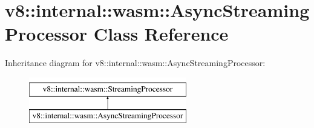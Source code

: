 \hypertarget{classv8_1_1internal_1_1wasm_1_1AsyncStreamingProcessor}{}\section{v8\+:\+:internal\+:\+:wasm\+:\+:Async\+Streaming\+Processor Class Reference}
\label{classv8_1_1internal_1_1wasm_1_1AsyncStreamingProcessor}
Inheritance diagram for v8\+:\+:internal\+:\+:wasm\+:\+:Async\+Streaming\+Processor\+:\begin{figure}[H]
\begin{center}
\leavevmode
\includegraphics[height=2.000000cm]{classv8_1_1internal_1_1wasm_1_1AsyncStreamingProcessor}
\end{center}
\end{figure}
